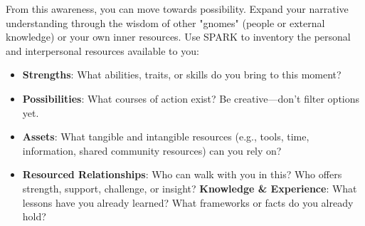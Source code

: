 \documentclass{article}
\begin{document}
From this awareness, you can move towards possibility. Expand your narrative understanding through the wisdom of other "gnomes" (people or external knowledge) or your own inner resources. Use SPARK to inventory the personal and interpersonal resources available to you:
\begin{itemize}[noitemsep,topsep=0pt]
    \item \textbf{Strengths}: What abilities, traits, or skills do you bring to this moment?
    \item \textbf{Possibilities}: What courses of action exist? Be creative—don't filter options yet.
    \item \textbf{Assets}: What tangible and intangible resources (e.g., tools, time, information, shared community resources) can you rely on?
    \item \textbf{Resourced Relationships}: Who can walk with you in this? Who offers strength, support, challenge, or insight?
    \textbf{Knowledge \& Experience}: What lessons have you already learned? What frameworks or facts do you already hold?
\end{itemize}
\end{document}
